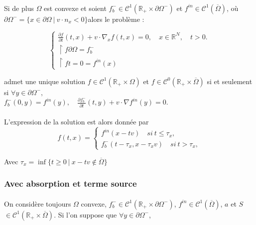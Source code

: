 \documentclass[onecolumn, 12pt, a4paper]{article}
\begin{document}
\paragraph{}
Si de plus $\Omega$ est convexe et soient $f_b^- \in \mathcal{C}^1(\mathbb{R}_+ \times \partial \Omega^-)$ et $f^{in} \in \mathcal{C}^1(\overline{\Omega})$, où $\partial \Omega^- = \{x\in\partial \Omega~ | ~ v\cdot n_x<0\}$alors le problème :


\[
\begin{cases}
\frac{\partial f}{\partial t}(t,x)+v \cdot \nabla_x f(t,x)=0, \quad x \in \mathbb{R}^N, \quad t>0.\\
\restriction{f}{\partial \Omega}= f_b^-\\
\restriction{f}{t=0}= f^{in}(x)
\end{cases}
\]

admet une unique solution $f \in \mathcal{C}^1(\mathbb{R}_+ \times \Omega)$ et $f \in \mathcal{C}^0(\mathbb{R}_+ \times \overline{\Omega})$ si et seulement si $\forall y \in \partial \Omega^-,$
\\$  f_b^- (0,y) = f^{in}(y), \quad \frac{\partial f_b^-}{\partial t}(t,y)+v \cdot \nabla f^{in}(y)=0$.

\paragraph{}

L'expression de la solution est alors donnée par 
\[
\boxed{
f(t,x)= 
\begin{cases}
f^{in}(x-tv) \quad si~ t \leq \tau_x ,\\
f_b^-(t-\tau_x,x-\tau_xv) \quad si~ t > \tau_x ,
\end{cases}
}
\]

Avec $\tau_x= \inf \{t \geq 0~ | ~ x-tv \notin \overline{\Omega}\}$

\subsubsection{Avec absorption et terme source}

\paragraph{}
On considère toujours $\Omega$ convexe, $f_b^- \in \mathcal{C}^1(\mathbb{R}_+ \times \partial \Omega^-)$, $f^{in} \in \mathcal{C}^1(\overline{\Omega})$, $a$ et $S$ $\in \mathcal{C}^1(\mathbb{R}_+ \times \overline{\Omega})$. Si l'on suppose que $\forall y \in \partial \Omega^-$,
\end{document}
